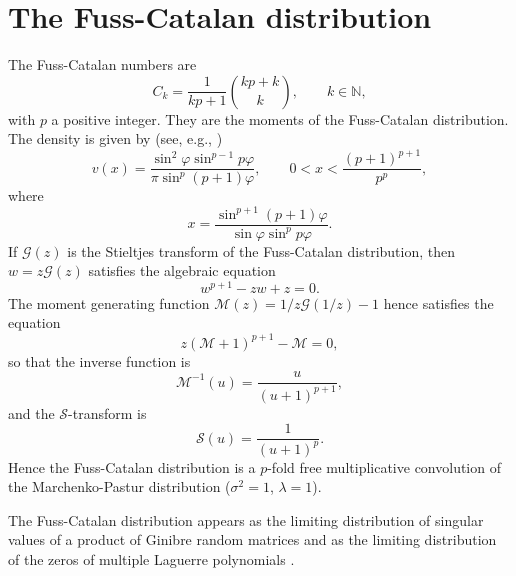 \documentclass[12pt]{article}
\newcommand{\St}{\mathcal{S}} %
\newcommand{\Gt}{\mathcal{G}} %
\newcommand{\Mt}{\mathcal{M}} %
\numberwithin{equation}{section}
\begin{document}
    
\section{The Fuss-Catalan distribution}
The Fuss-Catalan numbers are
\[   C_k = \frac{1}{kp+1} \binom{kp+k}{k},    \qquad k \in \mathbb{N}, \]
with $p$ a positive integer. They are the moments of the Fuss-Catalan distribution. 
The density is given by (see, e.g., \cite[Thm. 3.3]{NeuschelPR})
\[  v(x) = \frac{ \sin^2 \varphi \sin^{p-1} p\varphi}{\pi \sin^p (p+1)\varphi}, 
  \qquad 0 < x < \frac{(p+1)^{p+1}}{p^p}, \]
where
\[    x = \frac{ \sin^{p+1} (p+1)\varphi}{\sin \varphi \sin^p p\varphi}.  \]
If $\Gt(z)$ is the Stieltjes transform
of the Fuss-Catalan distribution, then $w=z\Gt(z)$ satisfies the algebraic equation
\[      w^{p+1} - zw + z = 0.   \]
The moment generating function $\Mt(z) = 1/z \Gt(1/z)-1$ hence satisfies the equation
\begin{equation}   \label{FC-M}
       z (\Mt+1)^{p+1} - \Mt = 0, 
\end{equation}
so that the inverse function is
\[     \Mt^{-1}(u) = \frac{u}{(u+1)^{p+1}}, \]
and the $\St$-transform is
\begin{equation}   \label{FC-S}
    \St(u) = \frac{1}{(u+1)^p}.
\end{equation}
Hence the Fuss-Catalan distribution is a $p$-fold free multiplicative convolution of the
Marchenko-Pastur distribution ($\sigma^2=1$, $\lambda=1$).

The Fuss-Catalan distribution appears as the limiting distribution of singular values of a product of Ginibre random matrices \cite{Forrester} and as the limiting distribution of the zeros of multiple Laguerre polynomials \cite{Neuschel}.
     
\end{document}
